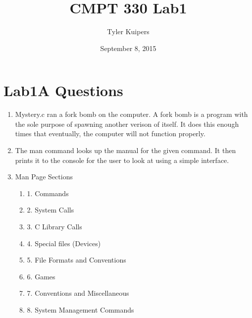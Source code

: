 \documentclass[12pt]{extarticle}
\title{CMPT 330 Lab1}
\author{Tyler Kuipers}
\date{September 8, 2015}
\begin{document}
\maketitle
\section*{Lab1A Questions}
	\begin{enumerate}
		\item Mystery.c ran a fork bomb on the computer.  A fork bomb is a program with the sole purpose of spawning another verison of itself.  It does this enough times that eventually, the computer will not function properly.
		\item The man command looks up the manual for the given command.  It then prints it to the console for the user to look at using a simple interface.
		\item Man Page Sections\begin{enumerate}
			\item 1. Commands
			\item 2. System Calls
			\item 3. C Library Calls
			\item 4. Special files (Devices)
			\item 5. File Formats and Conventions
			\item 6. Games
			\item 7. Conventions and Miscellaneous
			\item 8. System Management Commands
		\end{enumerate}
	\end{enumerate}
\end{document}
